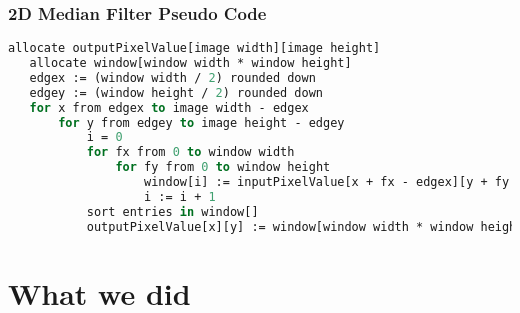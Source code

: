 \documentclass{beamer}
\begin{document}
\begin{frame}[fragile] %
\frametitle{2D Median Filter Pseudo Code}
\begin{scriptsize}
\begin{lstlisting}[frame=single, language=Pascal, basewidth=0.45em]
allocate outputPixelValue[image width][image height]
   allocate window[window width * window height]
   edgex := (window width / 2) rounded down
   edgey := (window height / 2) rounded down
   for x from edgex to image width - edgex
       for y from edgey to image height - edgey
           i = 0
           for fx from 0 to window width
               for fy from 0 to window height
                   window[i] := inputPixelValue[x + fx - edgex][y + fy - edgey]
                   i := i + 1
           sort entries in window[]
           outputPixelValue[x][y] := window[window width * window height / 2]
\end{lstlisting}
\end{scriptsize}
\end{frame}





\section{What we did}
\end{document}
